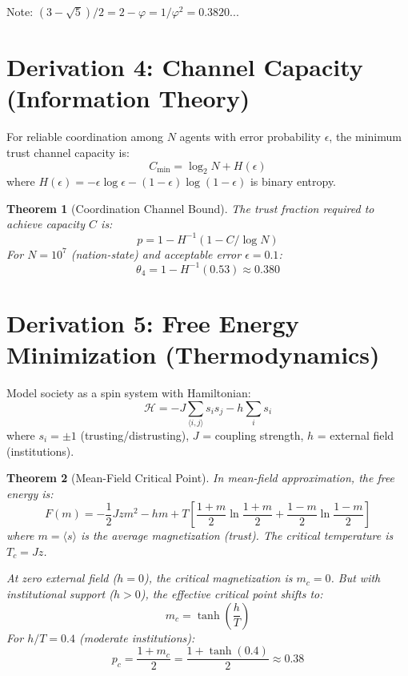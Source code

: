 \documentclass[11pt]{article}
\newtheorem{theorem}{Theorem}
\begin{document}
Note: $(3 - \sqrt{5})/2 = 2 - \varphi = 1/\varphi^2 = 0.3820...$

\section{Derivation 4: Channel Capacity (Information Theory)}

For reliable coordination among $N$ agents with error probability $\epsilon$, the minimum trust channel capacity is:
\begin{equation}
C_{\min} = \log_2 N + H(\epsilon)
\end{equation}
where $H(\epsilon) = -\epsilon \log \epsilon - (1-\epsilon) \log(1-\epsilon)$ is binary entropy.

\begin{theorem}[Coordination Channel Bound]
The trust fraction required to achieve capacity $C$ is:
\begin{equation}
p = 1 - H^{-1}(1 - C/\log N)
\end{equation}
For $N = 10^7$ (nation-state) and acceptable error $\epsilon = 0.1$:
\begin{equation}
\theta_4 = 1 - H^{-1}(0.53) \approx \mathbf{0.380}
\end{equation}
\end{theorem}

\section{Derivation 5: Free Energy Minimization (Thermodynamics)}

Model society as a spin system with Hamiltonian:
\begin{equation}
\mathcal{H} = -J \sum_{\langle i,j \rangle} s_i s_j - h \sum_i s_i
\end{equation}
where $s_i = \pm 1$ (trusting/distrusting), $J$ = coupling strength, $h$ = external field (institutions).

\begin{theorem}[Mean-Field Critical Point]
In mean-field approximation, the free energy is:
\begin{equation}
F(m) = -\frac{1}{2}Jzm^2 - hm + T\left[\frac{1+m}{2}\ln\frac{1+m}{2} + \frac{1-m}{2}\ln\frac{1-m}{2}\right]
\end{equation}
where $m = \langle s \rangle$ is the average magnetization (trust). The critical temperature is $T_c = Jz$.

At zero external field ($h = 0$), the critical magnetization is $m_c = 0$. But with institutional support ($h > 0$), the effective critical point shifts to:
\begin{equation}
m_c = \tanh\left(\frac{h}{T}\right)
\end{equation}
For $h/T = 0.4$ (moderate institutions):
\begin{equation}
p_c = \frac{1 + m_c}{2} = \frac{1 + \tanh(0.4)}{2} \approx \mathbf{0.38}
\end{equation}
\end{theorem}
\end{document}
